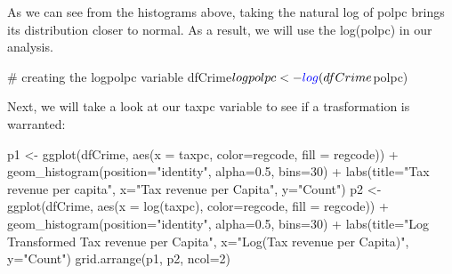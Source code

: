 \documentclass[]{article}
\newenvironment{Shaded}{}{}
\newcommand{\CommentTok}[1]{\textcolor[rgb]{0.00,0.50,0.00}{#1}}
\newcommand{\DataTypeTok}[1]{#1}
\newcommand{\DecValTok}[1]{#1}
\newcommand{\FloatTok}[1]{#1}
\newcommand{\KeywordTok}[1]{\textcolor[rgb]{0.00,0.00,1.00}{#1}}
\newcommand{\NormalTok}[1]{#1}
\newcommand{\OperatorTok}[1]{#1}
\newcommand{\StringTok}[1]{\textcolor[rgb]{0.00,0.50,0.50}{#1}}
\begin{document}
As we can see from the histograms above, taking the natural log of polpc
brings its distribution closer to normal. As a result, we will use the
log(polpc) in our analysis.

\begin{Shaded}
\begin{Highlighting}[]
\CommentTok{# creating the logpolpc variable}
\NormalTok{dfCrime}\OperatorTok{$}\NormalTok{logpolpc <-}\StringTok{ }\KeywordTok{log}\NormalTok{(dfCrime}\OperatorTok{$}\NormalTok{polpc)}
\end{Highlighting}
\end{Shaded}

Next, we will take a look at our taxpc variable to see if a
trasformation is warranted:

\begin{Shaded}
\begin{Highlighting}[]
\NormalTok{p1 <-}\StringTok{ }\KeywordTok{ggplot}\NormalTok{(dfCrime, }\KeywordTok{aes}\NormalTok{(}\DataTypeTok{x =}\NormalTok{ taxpc, }\DataTypeTok{color=}\NormalTok{regcode, }\DataTypeTok{fill =}\NormalTok{ regcode)) }\OperatorTok{+}
\StringTok{  }\KeywordTok{geom_histogram}\NormalTok{(}\DataTypeTok{position=}\StringTok{"identity"}\NormalTok{, }\DataTypeTok{alpha=}\FloatTok{0.5}\NormalTok{, }\DataTypeTok{bins=}\DecValTok{30}\NormalTok{) }\OperatorTok{+}
\StringTok{  }\KeywordTok{labs}\NormalTok{(}\DataTypeTok{title=}\StringTok{"Tax revenue per capita"}\NormalTok{, }\DataTypeTok{x=}\StringTok{"Tax revenue per Capita"}\NormalTok{, }\DataTypeTok{y=}\StringTok{"Count"}\NormalTok{)}
\NormalTok{p2 <-}\StringTok{ }\KeywordTok{ggplot}\NormalTok{(dfCrime, }\KeywordTok{aes}\NormalTok{(}\DataTypeTok{x =} \KeywordTok{log}\NormalTok{(taxpc), }\DataTypeTok{color=}\NormalTok{regcode, }\DataTypeTok{fill =}\NormalTok{ regcode)) }\OperatorTok{+}
\StringTok{  }\KeywordTok{geom_histogram}\NormalTok{(}\DataTypeTok{position=}\StringTok{"identity"}\NormalTok{, }\DataTypeTok{alpha=}\FloatTok{0.5}\NormalTok{, }\DataTypeTok{bins=}\DecValTok{30}\NormalTok{) }\OperatorTok{+}
\StringTok{  }\KeywordTok{labs}\NormalTok{(}\DataTypeTok{title=}\StringTok{"Log Transformed Tax revenue per Capita"}\NormalTok{, }\DataTypeTok{x=}\StringTok{"Log(Tax revenue per Capita)"}\NormalTok{, }\DataTypeTok{y=}\StringTok{"Count"}\NormalTok{)}
\KeywordTok{grid.arrange}\NormalTok{(p1, p2, }\DataTypeTok{ncol=}\DecValTok{2}\NormalTok{)}
\end{Highlighting}
\end{Shaded}
\end{document}
